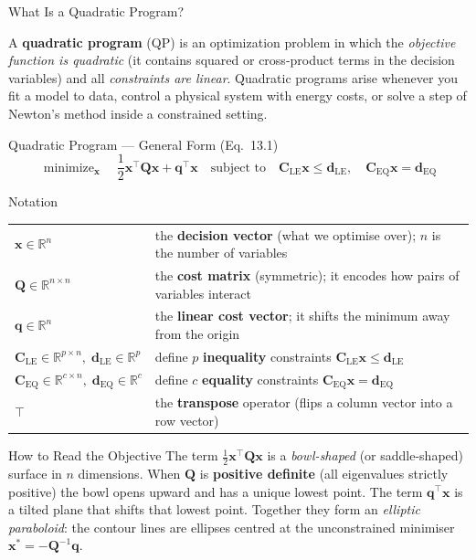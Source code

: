 \documentclass[aspectratio=169,10pt]{beamer}
\DeclareMathOperator*{\minimize}{minimize}
\newcommand{\bx}{\mathbf{x}}
\newcommand{\bq}{\mathbf{q}}
\newcommand{\bC}{\mathbf{C}}
\newcommand{\bd}{\mathbf{d}}
\newcommand{\bQ}{\mathbf{Q}}
\newcommand{\R}{\mathbb{R}}
\begin{document}
\begin{frame}[allowframebreaks]{What Is a Quadratic Program?}

  A \textbf{quadratic program} (QP) is an optimization problem in which the
  \emph{objective function is quadratic} (it contains squared or cross-product
  terms in the decision variables) and all \emph{constraints are linear}.
  Quadratic programs arise whenever you fit a model to data, control a physical
  system with energy costs, or solve a step of Newton's method inside a
  constrained setting.

  \begin{block}{Quadratic Program --- General Form (Eq.~13.1)}
    \[
      \minimize_{\bx}\quad \frac{1}{2}\bx^{\top}\bQ\bx + \bq^{\top}\bx
      \quad\text{subject to}\quad
      \bC_{\text{LE}}\bx \leq \bd_{\text{LE}},\quad
      \bC_{\text{EQ}}\bx = \bd_{\text{EQ}}
    \]
  \end{block}

  \begin{block}{Notation}
    \begin{tabular}{ll}
      $\bx \in \R^n$ & the \textbf{decision vector} (what we optimise over); $n$ is the number of variables\\
      $\bQ \in \R^{n\times n}$ & the \textbf{cost matrix} (symmetric); it encodes how pairs of variables interact\\
      $\bq \in \R^n$ & the \textbf{linear cost vector}; it shifts the minimum away from the origin\\
      $\bC_{\text{LE}} \in \R^{p\times n},\; \bd_{\text{LE}} \in \R^p$ & define $p$ \textbf{inequality} constraints $\bC_{\text{LE}}\bx \leq \bd_{\text{LE}}$\\
      $\bC_{\text{EQ}} \in \R^{c\times n},\; \bd_{\text{EQ}} \in \R^c$ & define $c$ \textbf{equality} constraints $\bC_{\text{EQ}}\bx = \bd_{\text{EQ}}$\\
      $\top$ & the \textbf{transpose} operator (flips a column vector into a row vector)\\
    \end{tabular}
  \end{block}

  \begin{alertblock}{How to Read the Objective}
    The term $\tfrac{1}{2}\bx^{\top}\bQ\bx$ is a \emph{bowl-shaped} (or saddle-shaped)
    surface in $n$ dimensions.  When $\bQ$ is \textbf{positive definite} (all eigenvalues
    strictly positive) the bowl opens upward and has a unique lowest point.
    The term $\bq^{\top}\bx$ is a tilted plane that shifts that lowest point.
    Together they form an \emph{elliptic paraboloid}: the contour lines are ellipses
    centred at the unconstrained minimiser $\bx^* = -\bQ^{-1}\bq$.
  \end{alertblock}


\end{frame}
\end{document}
